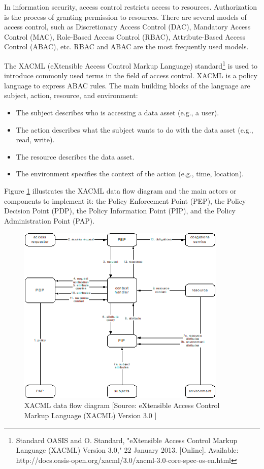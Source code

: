 In information security, access control restricts access to resources. Authorization is the process of granting permission to resources. There are several models of access control, such as Discretionary Access Control (DAC), Mandatory Access Control (MAC), Role-Based Access Control (RBAC), Attribute-Based Access Control (ABAC), etc. RBAC and ABAC are the most frequently used models.

The XACML (eXtensible Access Control Markup Language) standard\footnote{ Standard OASIS and O. Standard, "eXtensible Access Control Markup Language (XACML) Version 3.0," 22 January 2013. [Online]. Available: http://docs.oasis-open.org/xacml/3.0/xacml-3.0-core-spec-os-en.html } is used to introduce commonly used terms in the field of access control. XACML is a policy language to express ABAC rules. The main building blocks of the language are subject, action, resource, and environment: 

\begin{itemize}
	\item The subject describes who is accessing a data asset (e.g., a user). 

	\item The action describes what the subject wants to do with the data asset (e.g., read, write). 

	\item The resource describes the data asset. 

	\item The environment specifies the context of the action (e.g., time, location).
\end{itemize}

Figure \ref{fig:xacml} illustrates the XACML data flow diagram and the main actors or components to implement it: the Policy Enforcement Point (PEP), the Policy Decision Point (PDP), the Policy Information Point (PIP), and the Policy Administration Point (PAP).


\begin{figure}[H]
	\begin{Center}
		\includegraphics[width=3.94in,height=3.39in]{./media/image67.png}
		\caption{XACML data flow diagram [Source:  eXtensible Access Control Markup Language (XACML) Version 3.0 ]}
		\label{fig:xacml}
	\end{Center}
\end{figure}


